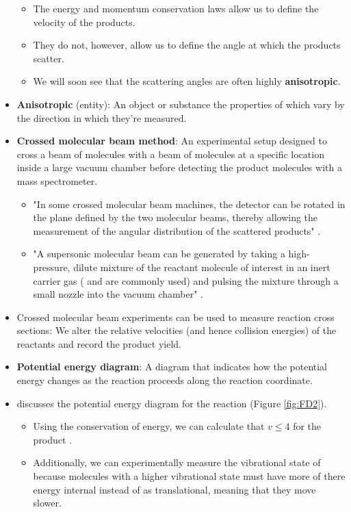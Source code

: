 \documentclass[../notes.tex]{subfiles}
\begin{document}
\begin{itemize}
\begin{itemize}
        \item The energy and momentum conservation laws allow us to define the velocity of the products.
        \item They do not, however, allow us to define the angle at which the products scatter.
        \item We will soon see that the scattering angles are often highly \textbf{anisotropic}.
    \end{itemize}
    \item \textbf{Anisotropic} (entity): An object or substance the properties of which vary by the direction in which they're measured.
    \item \textbf{Crossed molecular beam method}: An experimental setup designed to cross a beam of  molecules with a beam of  molecules at a specific location inside a large vacuum chamber before detecting the product molecules with a mass spectrometer.
    \begin{itemize}
        \item "In some crossed molecular beam machines, the detector can be rotated in the plane defined by the two molecular beams, thereby allowing the measurement of the angular distribution of the scattered products" \parencite[1244]{bib:McQuarrieSimon}.
        \item "A supersonic molecular beam can be generated by taking a high-pressure, dilute mixture of the reactant molecule of interest in an inert carrier gas ( and  are commonly used) and pulsing the mixture through a small nozzle into the vacuum chamber" \parencite[1244]{bib:McQuarrieSimon}.
    \end{itemize}
    \item Crossed molecular beam experiments can be used to measure reaction cross sections: We alter the relative velocities (and hence collision energies) of the reactants and record the product yield.
    \item {}\textbf{Potential energy diagram}: A diagram that indicates how the potential energy changes as the reaction proceeds along the reaction coordinate.
    \item \textcite{bib:McQuarrieSimon} discusses the potential energy diagram for the  reaction (Figure \ref{fig:FD2}).
    \begin{itemize}
        \item Using the conservation of energy, we can calculate that $v\leq 4$ for the product .
        \item Additionally, we can experimentally measure the vibrational state of  because molecules with a higher vibrational state must have more of there energy internal instead of as translational, meaning that they move slower.

\end{itemize}
\end{itemize}
\end{document}
